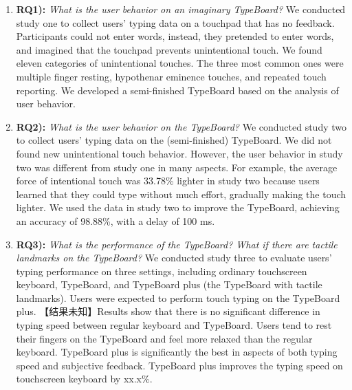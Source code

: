 \begin{enumerate}
	\item{\textbf{RQ1):} \emph{What is the user behavior on an imaginary TypeBoard?} We conducted study one to collect users' typing data on a touchpad that has no feedback. Participants could not enter words, instead, they pretended to enter words, and imagined that the touchpad prevents unintentional touch. We found eleven categories of unintentional touches. The three most common ones were multiple finger resting, hypothenar eminence touches, and repeated touch reporting. We developed a semi-finished TypeBoard based on the analysis of user behavior.}
	\item{\textbf{RQ2):} \emph{What is the user behavior on the TypeBoard?} We conducted study two to collect users' typing data on the (semi-finished) TypeBoard. We did not found new unintentional touch behavior. However, the user behavior in study two was different from study one in many aspects. For example, the average force of intentional touch was 33.78\% lighter in study two because users learned that they could type without much effort, gradually making the touch lighter. We used the data in study two to improve the TypeBoard, achieving an accuracy of 98.88\%, with a delay of 100 ms.}
	\item{\textbf{RQ3):} \emph{What is the performance of the TypeBoard? What if there are tactile landmarks on the TypeBoard?} We conducted study three to evaluate users' typing performance on three settings, including ordinary touchscreen keyboard, TypeBoard, and TypeBoard plus (the TypeBoard with tactile landmarks). Users were expected to perform touch typing on the TypeBoard plus. 【结果未知】Results show that there is no significant difference in typing speed between regular keyboard and TypeBoard. Users tend to rest their fingers on the TypeBoard and feel more relaxed than the regular keyboard. TypeBoard plus is significantly the best in aspects of both typing speed and subjective feedback. TypeBoard plus improves the typing speed on touchscreen keyboard by xx.x\%.}
\end{enumerate}

